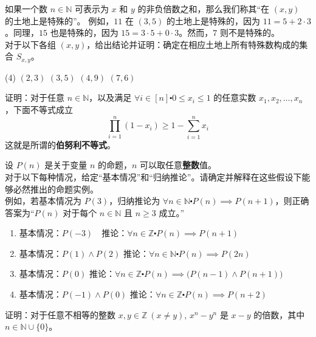 \begin{exercise}
    如果一个数 $n \in \mathbb{N}$ 可表示为 $x$ 和 $y$ 的非负倍数之和，那么我们称其``在 $(x, y)$ 的土地上是特殊的''。 例如，$11$ 在 $(3, 5)$ 的土地上是特殊的，因为 $11 = 5 + 2 \cdot 3$。同理，$15$ 也是特殊的，因为 $15 = 3 \cdot 5 + 0 \cdot 3$。然而，$7$ 则不是特殊的。\\
    对于以下各组 $(x, y)$，给出结论并证明：确定在相应土地上所有特殊数构成的集合 $S_{x,y}$。
    \begin{tasks}(4)
        \task $(2, 3)$
        \task $(3, 5)$
        \task $(4, 9)$
        \task $(7, 6)$
    \end{tasks}
\end{exercise}

\begin{exercise}
    证明：对于任意 $n \in \mathbb{N}$，以及满足 $\forall i \in [n] \centerdot 0 \le x_i \le 1$ 的任意实数 $x_1, x_2, \dots, x_n$，下面不等式成立
    \[\prod_{i=1}^{n} (1-x_i) \ge 1-\sum_{i=1}^{n}x_i\]
    这就是所谓的\textbf{伯努利不等式}。
\end{exercise}

\begin{exercise}
    设 $P(n)$ 是关于变量 $n$ 的命题，$n$ 可以取任意\textbf{整数}值。\\
    对于以下每种情况，给定``基本情况''和``归纳推论''。请确定并解释在这些假设下能够必然推出的命题实例。\\
    例如，若基本情况为 $P(3)$，归纳推论为 $\forall n \in \mathbb{N} \centerdot P(n) \implies P(n+1)$，则正确答案为``$P(n)$ 对于每个 $n \in \mathbb{N}$ 且 $n \ge 3$ 成立。''
    \begin{enumerate}[label=(\alph*)]
        \item 基本情况：$P(-3)$ \qquad\quad\enspace\,\, 推论：$\forall n \in \mathbb{Z} \centerdot P(n) \implies P(n+1)$
        \item 基本情况：$P(1) \land P(2)$ \quad\;\; 推论：$\forall n \in \mathbb{N} \centerdot P(n) \implies P(2n)$
        \item 基本情况：$P(0)$ \qquad\qquad\quad 推论：$\forall n \in \mathbb{Z} \centerdot P(n) \implies \big(P(n-1) \land P(n+1)\big)$
        \item 基本情况：$P(-1) \land P(0)$ \quad 推论：$\forall n \in \mathbb{Z} \centerdot P(n) \implies P(n+2)$
    \end{enumerate}
\end{exercise}

\begin{exercise}
    证明：对于任意不相等的整数 $x,y \in \mathbb{Z}\ (x \ne y)$, $x^n-y^n$ 是 $x-y$ 的倍数，其中 $n \in \mathbb{N} \cup \{0\}$。
\end{exercise}

